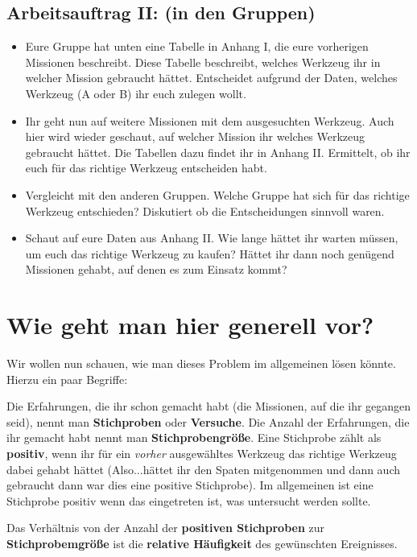 \documentclass[]{article}
\begin{document}
\subsection*{Arbeitsauftrag II: (in den Gruppen)}
\begin{itemize}
	\item Eure Gruppe hat unten eine Tabelle in Anhang I, die eure vorherigen Missionen beschreibt. Diese Tabelle beschreibt, welches Werkzeug ihr in welcher Mission gebraucht hättet. Entscheidet aufgrund der Daten, welches Werkzeug (A oder B) ihr euch zulegen wollt. 
	\item Ihr geht nun auf weitere Missionen mit dem ausgesuchten Werkzeug. Auch hier wird wieder geschaut, auf welcher Mission ihr welches Werkzeug gebraucht hättet. Die Tabellen dazu findet ihr in Anhang II. Ermittelt, ob ihr euch für das richtige Werkzeug entscheiden habt.
	\item Vergleicht mit den anderen Gruppen. Welche Gruppe hat sich für das richtige Werkzeug entschieden? Diskutiert ob die Entscheidungen sinnvoll waren.
	\item Schaut auf eure Daten aus Anhang II. Wie lange hättet ihr warten müssen, um euch das richtige Werkzeug zu kaufen? Hättet ihr dann noch genügend Missionen gehabt, auf denen es zum Einsatz kommt?
\end{itemize}

\section*{Wie geht man hier generell vor?}

Wir wollen nun schauen, wie man dieses Problem im allgemeinen lösen könnte. Hierzu ein paar Begriffe:

Die Erfahrungen, die ihr schon gemacht habt (die Missionen, auf die ihr gegangen seid), nennt man \textbf{Stichproben} oder \textbf{Versuche}. Die Anzahl der Erfahrungen, die ihr gemacht habt nennt man \textbf{Stichprobengröße}. Eine Stichprobe zählt als \textbf{positiv}, wenn ihr für ein \textit{vorher} ausgewähltes Werkzeug das richtige Werkzeug dabei gehabt hättet (Also...hättet ihr den Spaten mitgenommen und dann auch gebraucht dann war dies eine positive Stichprobe). Im allgemeinen ist eine Stichprobe positiv wenn das eingetreten ist, was untersucht werden sollte. 

Das Verhältnis von der Anzahl der \textbf{positiven Stichproben} zur \textbf{Stichprobemgröße} ist die \textbf{relative Häufigkeit} des gewünschten Ereignisses. 
\end{document}
